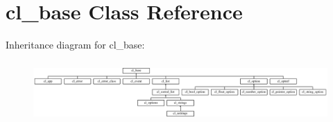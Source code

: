 \hypertarget{classcl__base}{
\section{cl\_\-base Class Reference}
\label{classcl__base}
}
Inheritance diagram for cl\_\-base:\begin{figure}[H]
\begin{center}
\leavevmode
\includegraphics[height=2.333333cm]{classcl__base}
\end{center}
\end{figure}
